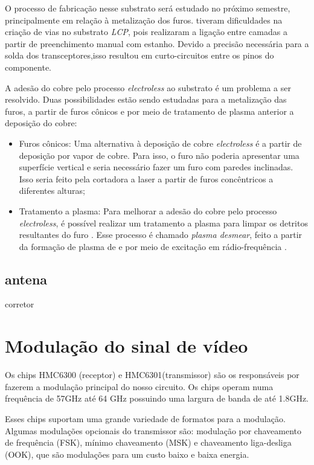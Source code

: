 O processo de fabricação nesse substrato será estudado no próximo semestre, principalmente em relação à metalização dos furos. \citeauthor{TCC} tiveram dificuldades na criação de vias no substrato \textit{LCP}, pois realizaram a ligação entre camadas a partir de preenchimento manual com estanho. Devido a precisão necessária para a solda dos transceptores,isso resultou em curto-circuitos entre os pinos do componente.

A adesão do cobre pelo processo \textit{electroless} ao substrato é um problema a ser resolvido. Duas possibilidades estão sendo estudadas para a metalização das furos, a partir de furos cônicos e por meio de tratamento de plasma anterior a deposição do cobre:
\begin{itemize}
    \item Furos cônicos: Uma alternativa à deposição de cobre \textit{electroless} é a partir de deposição por vapor de cobre. Para isso, o furo não poderia apresentar uma superfície vertical e seria necessário fazer um furo com paredes inclinadas. Isso seria feito pela cortadora a laser a partir de furos concêntricos a diferentes alturas;
    \item Tratamento a plasma: Para melhorar a adesão do cobre pelo processo \textit{electroless}, é possível realizar um tratamento a plasma para limpar os detritos resultantes do furo \cite{zhang2002processing}. Esse processo é chamado \textit{plasma desmear}, feito a partir da formação de plasma de  e  por meio de excitação em rádio-frequência \cite{7478111}.
\end{itemize}

\subsection{antena}

corretor

\section{Modulação do sinal de vídeo}

Os chips HMC6300 (receptor) e HMC6301(transmissor) são os responsáveis por fazerem a modulação principal do nosso circuito. Os chips operam numa frequência de 57GHz até 64 GHz possuindo uma largura de banda de até 1.8GHz. 

Esses chips suportam uma grande variedade de formatos para a modulação. Algumas modulações opcionais do transmissor são: modulação por chaveamento de frequência (FSK), mínimo chaveamento (MSK) e chaveamento liga-desliga (OOK), que são modulações para um custo baixo e baixa energia.

